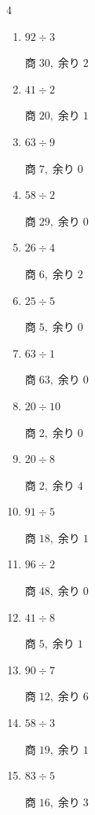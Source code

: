 \begin{multicols}{4}
\begin{enumerate}
        $商\; 44,\; 余り\; 1$

  \item $92 \div 3$

        $商\; 30,\; 余り\; 2$

  \item $41 \div 2$

        $商\; 20,\; 余り\; 1$

  \item $63 \div 9$

        $商\; 7,\; 余り\; 0$

  \item $58 \div 2$

        $商\; 29,\; 余り\; 0$

  \item $26 \div 4$

        $商\; 6,\; 余り\; 2$

  \item $25 \div 5$

        $商\; 5,\; 余り\; 0$

  \item $63 \div 1$

        $商\; 63,\; 余り\; 0$

  \item $20 \div 10$

        $商\; 2,\; 余り\; 0$

  \item $20 \div 8$

        $商\; 2,\; 余り\; 4$

  \item $91 \div 5$

        $商\; 18,\; 余り\; 1$

  \item $96 \div 2$

        $商\; 48,\; 余り\; 0$

  \item $41 \div 8$

        $商\; 5,\; 余り\; 1$

  \item $90 \div 7$

        $商\; 12,\; 余り\; 6$

  \item $58 \div 3$

        $商\; 19,\; 余り\; 1$

  \item $83 \div 5$

        $商\; 16,\; 余り\; 3$


\end{enumerate}
\end{multicols}
